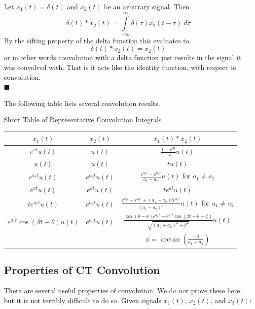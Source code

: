 \begin{example} Let $x_1(t) = \delta(t)$ and $x_2(t)$ be an arbitrary signal. Then
  \[
  \delta(t) * x_2(t) = \int\limits_{-\infty}^{\infty} \delta(\tau)x_2(t-\tau) \; d\tau
  \]
  By the sifting property of the delta function this evaluates to
  \[
  \delta(t) * x_2(t) = x_2(t)
  \]
  or in other words convolution with a delta function just results in the signal it was convolved with. That is it acts like the identity function, with respect to convolution.\\
  $\blacksquare$
\end{example}

The following table lists several convolution results.

\begin{center}
  Short Table of Representative Convolution Integrals
  \vspace{1em}
  
\bgroup
\def\arraystretch{2}
\setlength\tabcolsep{2em}
\begin{tabular}{|c|c|c|}
  \hline
  $x_1(t)$ & $x_2(t)$ & $x_1(t) * x_2(t)$\\
  \hline
  \hline
  $e^{a t}u(t)$ & $u(t)$ & $\frac{1-e^{a t}}{-a}u(t)$\\
  $u(t)$ & $u(t)$ & $tu(t)$\\
  $e^{a_1 t}u(t)$ & $e^{a_2 t}u(t)$ & $\frac{e^{a_1 t}-e^{a_2 t}}{a_1 - a_2}u(t)$ for $a_1 \neq a_2$\\
  $e^{a t}u(t)$ & $e^{a t}u(t)$ & $te^{a t}u(t)$\\
  $te^{a_1 t}u(t)$ & $e^{a_2 t}u(t)$ & $\frac{e^{a_2 t}-e^{a_1 t} + (a_1-a_2)te^{a_1 t}}{(a_1 - a_2)^2}u(t)$ for $a_1 \neq a_2$\\
  $e^{a_1 t}\cos(\beta t + \theta)u(t)$ & $e^{a_2 t}u(t)$ & $\frac{\cos(\theta - \phi)e^{a_2 t} - e^{a_1 t}\cos(\beta t + \theta - \phi)}{\sqrt{(a_1 + a_2)^2 + \beta^2}}u(t)$\\
  & & $\phi = \arctan\left( \frac{-\beta}{a_1 + a_2}\right)$\\
\hline                       
\end{tabular}
\egroup

\end{center}

\subsection{Properties of CT Convolution}
There are several useful properties of convolution. We do not prove these here, but it is not terribly difficult to do so. Given signals $x_1(t)$, $x_2(t)$, and $x_3(t)$:


